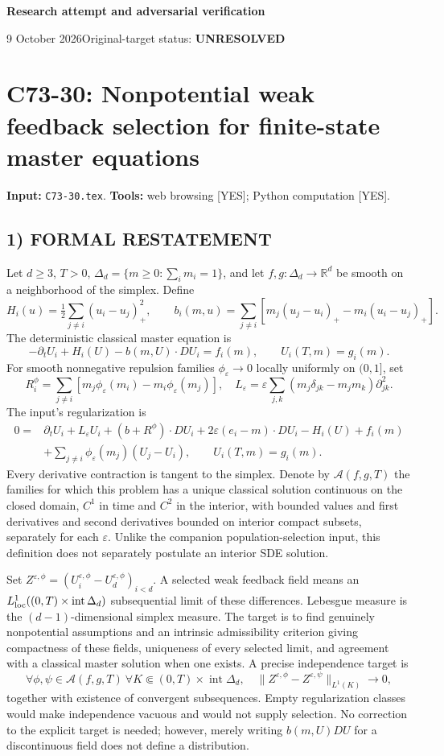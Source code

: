 \documentclass[11pt,a4paper]{article}
\theoremstyle{definition}
\theoremstyle{remark}
\begin{document}
{\large\bfseries Research attempt and adversarial verification}\par
9 October 2026\hfill Original-target status: \textbf{UNRESOLVED}\par
\section{C73-30: Nonpotential weak feedback selection for finite-state master equations}
\label{sec:C73-30}
\noindent\textbf{Input:} \texttt{C73-30.tex}. \quad\textbf{Tools:} web browsing [YES]; Python computation [YES].
\subsection*{1) FORMAL RESTATEMENT}
Let $d\geq3$, $T>0$, $\Delta_d=\{m\geq0:\sum_i m_i=1\}$, and let $f,g:\Delta_d\to\mathbb R^d$ be smooth on a neighborhood of the simplex. Define
\[
 H_i(u)=\tfrac12\sum_{j\ne i}(u_i-u_j)_+^2,
 \qquad b_i(m,u)=\sum_{j\ne i}[m_j(u_j-u_i)_+-m_i(u_i-u_j)_+].
\]
The deterministic classical master equation is
\[
 -\partial_t U_i+H_i(U)-b(m,U)\cdot DU_i=f_i(m),
 \qquad U_i(T,m)=g_i(m).
\]
For smooth nonnegative repulsion families $\phi_\varepsilon\to0$ locally uniformly on $(0,1]$, set
\[
 R_i^\phi=\sum_{j\ne i}[m_j\phi_\varepsilon(m_i)-m_i\phi_\varepsilon(m_j)],
 \quad L_\varepsilon=\varepsilon\sum_{j,k}(m_j\delta_{jk}-m_jm_k)\partial_{jk}^2.
\]
The input's regularization is
\begin{align*}
0={}&\partial_tU_i+L_\varepsilon U_i+(b+R^\phi)\cdot DU_i
 +2\varepsilon(e_i-m)\cdot DU_i-H_i(U)+f_i(m)\\
&+\sum_{j\ne i}\phi_\varepsilon(m_j)(U_j-U_i),\qquad U_i(T,m)=g_i(m).
\end{align*}
Every derivative contraction is tangent to the simplex. Denote by $\mathcal A(f,g,T)$ the families for which this problem has a unique classical solution continuous on the closed domain, $C^1$ in time and $C^2$ in the interior, with bounded values and first derivatives and second derivatives bounded on interior compact subsets, separately for each $\varepsilon$. Unlike the companion population-selection input, this definition does not separately postulate an interior SDE solution.

Set $Z^{\varepsilon,\phi}=(U_i^{\varepsilon,\phi}-U_d^{\varepsilon,\phi})_{i<d}$. A selected weak feedback field means an $L^1_{\rm loc}((0,T)\times\operatorname{int}\Delta_d)$ subsequential limit of these differences. Lebesgue measure is the $(d-1)$-dimensional simplex measure. The target is to find genuinely nonpotential assumptions and an intrinsic admissibility criterion giving compactness of these fields, uniqueness of every selected limit, and agreement with a classical master solution when one exists. A precise independence target is
\[
 \forall\phi,\psi\in\mathcal A(f,g,T)\ \forall K\Subset(0,T)\times\operatorname{int}\Delta_d,
 \quad\|Z^{\varepsilon,\phi}-Z^{\varepsilon,\psi}\|_{L^1(K)}\longrightarrow0,
\]
together with existence of convergent subsequences. Empty regularization classes would make independence vacuous and would not supply selection. No correction to the explicit target is needed; however, merely writing $b(m,U)DU$ for a discontinuous field does not define a distribution.
\end{document}
